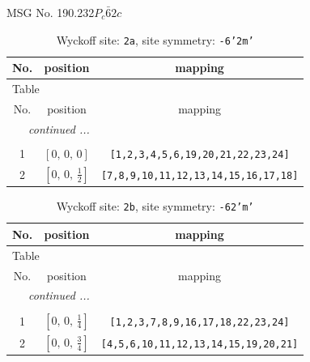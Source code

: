 \documentclass[fleqn,8pt]{jsarticle}
\begin{document}
\setcounter{MaxMatrixCols}{32}

\renewcommand{\tablename}{Table~}
\renewcommand{\figurename}{Figure~}
\begin{center}
\LARGE
MSG No. 190.232\quad$P_{c}\bar{6}2c$
\end{center}
\renewcommand{\arraystretch}{1.2}
\begin{longtable}{ccc}
\caption{Wyckoff site: {\tt 2a}, site symmetry: {\tt -6'2m'}}
 \\
 \hline \hline
No. & position & mapping \\ \hline \endfirsthead

\multicolumn{2}{l}{\tablename\ \thetable{}} \\
 \hline \hline
No. & position & mapping \\ \hline \endhead

 \hline \hline
\multicolumn{2}{r}{\footnotesize\it continued ...} \\ \endfoot

 \hline \hline
\multicolumn{2}{r}{} \\ \endlastfoot

1 & $\left[ 0,\, 0,\, 0 \right]$ & {\tt [1,2,3,4,5,6,19,20,21,22,23,24]} \\ \hline
2 & $\left[ 0,\, 0,\, \frac{1}{2} \right]$ & {\tt [7,8,9,10,11,12,13,14,15,16,17,18]} \\
\end{longtable}
\renewcommand{\arraystretch}{1.2}
\begin{longtable}{ccc}
\caption{Wyckoff site: {\tt 2b}, site symmetry: {\tt -62'm'}}
 \\
 \hline \hline
No. & position & mapping \\ \hline \endfirsthead

\multicolumn{2}{l}{\tablename\ \thetable{}} \\
 \hline \hline
No. & position & mapping \\ \hline \endhead

 \hline \hline
\multicolumn{2}{r}{\footnotesize\it continued ...} \\ \endfoot

 \hline \hline
\multicolumn{2}{r}{} \\ \endlastfoot

1 & $\left[ 0,\, 0,\, \frac{1}{4} \right]$ & {\tt [1,2,3,7,8,9,16,17,18,22,23,24]} \\ \hline
2 & $\left[ 0,\, 0,\, \frac{3}{4} \right]$ & {\tt [4,5,6,10,11,12,13,14,15,19,20,21]} \\
\end{longtable}
\end{document}
